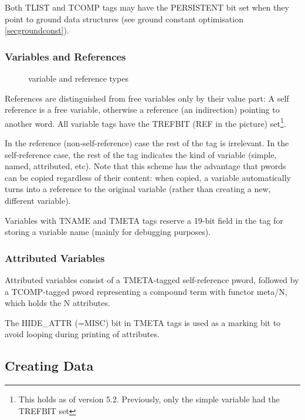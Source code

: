 Both TLIST and TCOMP tags may have the PERSISTENT  bit set when they point
to ground data structures (see ground constant optimisation \ref{secgroundconst}).

\subsubsection{Variables and References}
\begin{figure}
\caption{{\eclipse} variable and reference types}
\end{figure}
References are distinguished from free variables  only by their value part:
A self reference  is a free variable, otherwise a reference  (an indirection)
pointing to another word.
All variable tags have the TREFBIT  (REF in the picture) set\footnote{
This holds as of version 5.2. Previously, only the simple variable had
the TREFBIT set}.

In the reference (non-self-reference) case the rest of the tag is
irrelevant.  In the self-reference case, the rest of the tag indicates
the kind of variable (simple, named, attributed, etc).
Note that this scheme has the advantage that pwords can be copied
regardless of their content: when copied, a variable automatically
turns into a reference to the original variable (rather than creating
a new, different variable).

Variables with TNAME  and TMETA  tags reserve a 19-bit field in the tag
for storing a variable name  (mainly for debugging purposes).


\subsubsection{Attributed Variables}

Attributed variables  consist of a TMETA-tagged self-reference pword,
followed by a TCOMP-tagged pword representing a compound term with
functor meta/N, which holds the N attributes.

The HIDE_ATTR  (=MISC) bit in TMETA tags is used as a marking bit to
avoid looping during printing of attributes.



\subsection{Creating Data}

